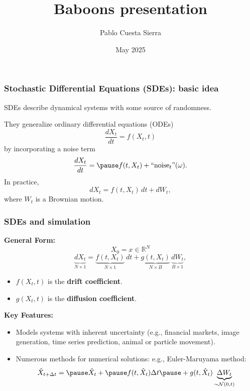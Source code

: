 \documentclass[
    aspectratio=149,
    10pt,
]{beamer}
\title{Baboons presentation}
\author{Pablo Cuesta Sierra}
\date{May 2025}
\begin{document}
\begin{frame}
\frametitle{Stochastic Differential Equations (SDEs): basic idea}


       SDEs describe dynamical systems with some source of randomness. \pause

       They generalize ordinary differential equations (ODEs)
        \[
           \frac{dX_t}{dt} = f(X_t, t)
        \]
        by incorporating a noise term 
        \[
           \frac{dX_t}{dt} = \pause f(t, X_t) + \text{``noise}_t\text{''}(\omega).
        \]
    \pause
        In practice,\[
            dX_t = f(t, X_t)\, dt + dW_t,
        \]
        where \(
            W_t
        \) is a Brownian motion.

\end{frame}

\begin{frame}
\frametitle{SDEs and simulation}

\textbf{General Form:} 
\[
    X_0 = x \in \mathbb{R}^N
\]
\[
    \underbrace{dX_t}_{N\times 1} = \underbrace{f(t, X_t)}_{N\times 1}\, dt + \underbrace{g(t, X_t)}_{N\times B}\, \underbrace{dW_t}_{B\times 1},
\]
\begin{itemize}
    \item \( f(X_t, t) \) is the \textbf{drift coefficient}.
    \item \( g(X_t, t) \) is the \textbf{diffusion coefficient}.
\end{itemize}
\pause

\textbf{Key Features:}
\begin{itemize}
    \item Models systems with inherent uncertainty (e.g., financial markets, image generation, time series prediction, animal or particle movement).
    \pause
    \item Numerous methods for numerical solutions: e.g., Euler-Maruyama method:\[
        \hat X_{t+\Delta t} = \pause \hat X_t + \pause f(t, \hat X_t)\Delta t  \pause + g(t, \hat X_t)\underbrace{\Delta W_t}_{\sim \mathcal N(0, t)}
    \]
\end{itemize}

\end{frame}
\end{document}
